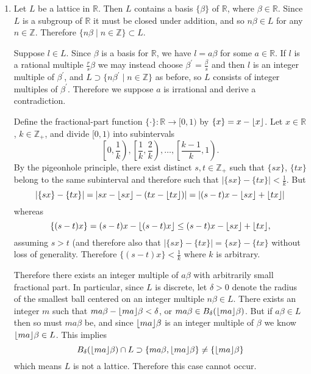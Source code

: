 \documentclass{article}
\DeclarePairedDelimiter\floor{\lfloor}{\rfloor}
\begin{document}
\begin{Answer}
  \begin{enumerate}
    \item{
      Let $L$ be a lattice in $\mathbb{R}$. Then $L$ contains a basis
      $\{ \beta \}$ of $\mathbb{R}$, where $\beta \in
      \mathbb{R}$. Since $L$ is a subgroup of $\mathbb{R}$ it must be
      closed under addition, and so $n \beta \in L$ for any $n \in \mathbb{Z}$.
      Therefore $\{ n \beta \mid n \in \mathbb{Z} \} \subset L$.

      Suppose $l \in L$. Since $\beta$ is a basis for $\mathbb{R}$, we
      have $l = a \beta$ for some $a \in \mathbb{R}$. If $l$ is a
      rational multiple $\frac{r}{s}\beta$ we may
      instead choose $\beta^\prime = \frac{\beta}{s}$ and then $l$ is
      an integer multiple of $\beta^\prime$, and
      $L \supset \{ n \beta^\prime \mid n \in \mathbb{Z} \}$ as
      before, so $L$ consists of integer multiples of $\beta^\prime$.
      Therefore we suppose  $a$ is irrational and derive a contradiction.

      Define the fractional-part function $\{ \cdot \} : \mathbb{R}
      \to [0,1)$ by $\{ x \} = x - \floor{x}$.
      Let $x \in \mathbb{R}$,
      $k \in \mathbb{Z}_+$, and divide $[0,1)$ into subintervals
      $$
      \left[ 0, \frac{1}{k} \right),
      \left[ \frac{1}{k}, \frac{2}{k} \right),
      \dots,
      \left[ \frac{k-1}{k}, 1 \right).
      $$
      By the pigeonhole principle, there exist distinct $s, t \in \mathbb{Z}_+$
      such that $\{ s x \}$, $\{ t x \}$ belong to the same
      subinterval and therefore such that
      $|\{ s x \} - \{t x\}| < \frac{1}{k}$. But
      $$
      |\{ s x \} - \{t x\}|
        = |s x - \floor{s x} - (tx - \floor{t x})|
        = |(s - t)x - \floor{s x} + \floor{t x}|
      $$
      whereas
      $$
      \{ (s - t)x \}
        =    (s - t)x - \floor{(s - t)x}
        \leq (s - t)x - \floor{s x} + \floor{t x},
      $$
      assuming $s > t$ (and therefore also that
      $|\{sx\} - \{tx\}| = \{sx\} - \{tx\}$ without loss of generality. Therefore
      $\{ (s - t)x \} < \frac{1}{k}$ where $k$ is arbitrary.

      Therefore there exists an integer multiple of $a \beta$ with arbitrarily
      small fractional part.
      In particular, since $L$ is discrete, let $\delta > 0$ denote the radius of the
      smallest ball centered on an integer multiple $n \beta \in L$.
      There exists an integer $m$ such that
      $m a \beta - \floor{m a} \beta < \delta$, or
      $m a \beta \in B_{\delta}(\floor{m a} \beta)$.
      But if $a \beta \in L$ then so must $m a \beta$ be,
      and since $\floor{m a} \beta$ is an integer multiple of $\beta$
      we know $\floor{m a} \beta \in L$. This implies
      $$
      B_{\delta}(\floor{m a} \beta) \cap L \supset \{ m a \beta,
      \floor{m a} \beta \} \neq \{ \floor{m a} \beta \}
      $$
      which means $L$ is not a lattice. Therefore this case cannot occur.

}
\end{enumerate}
\end{Answer}
\end{document}
